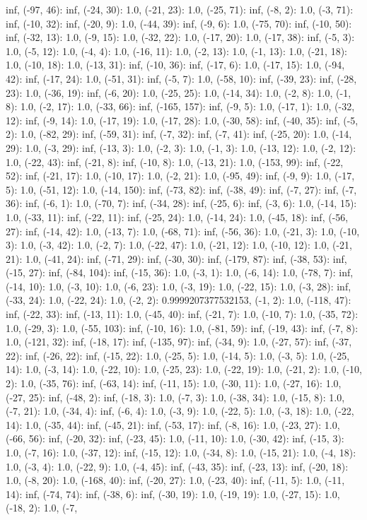 \documentclass[parskip=half]{scrartcl}
\begin{document}
inf, (-97, 46): inf, (-24, 30): 1.0, (-21, 23): 1.0, (-25, 71): inf, (-8, 2): 1.0, (-3, 71): inf, (-10, 32): inf, (-20, 9): 1.0, (-44, 39): inf, (-9, 6): 1.0, (-75, 70): inf, (-10, 50): inf, (-32, 13): 1.0, (-9, 15): 1.0, (-32, 22): 1.0, (-17, 20): 1.0, (-17, 38): inf, (-5, 3): 1.0, (-5, 12): 1.0, (-4, 4): 1.0, (-16, 11): 1.0, (-2, 13): 1.0, (-1, 13): 1.0, (-21, 18): 1.0, (-10, 18): 1.0, (-13, 31): inf, (-10, 36): inf, (-17, 6): 1.0, (-17, 15): 1.0, (-94, 42): inf, (-17, 24): 1.0, (-51, 31): inf, (-5, 7): 1.0, (-58, 10): inf, (-39, 23): inf, (-28, 23): 1.0, (-36, 19): inf, (-6, 20): 1.0, (-25, 25): 1.0, (-14, 34): 1.0, (-2, 8): 1.0, (-1, 8): 1.0, (-2, 17): 1.0, (-33, 66): inf, (-165, 157): inf, (-9, 5): 1.0, (-17, 1): 1.0, (-32, 12): inf, (-9, 14): 1.0, (-17, 19): 1.0, (-17, 28): 1.0, (-30, 58): inf, (-40, 35): inf, (-5, 2): 1.0, (-82, 29): inf, (-59, 31): inf, (-7, 32): inf, (-7, 41): inf, (-25, 20): 1.0, (-14, 29): 1.0, (-3, 29): inf, (-13, 3): 1.0, (-2, 3): 1.0, (-1, 3): 1.0, (-13, 12): 1.0, (-2, 12): 1.0, (-22, 43): inf, (-21, 8): inf, (-10, 8): 1.0, (-13, 21): 1.0, (-153, 99): inf, (-22, 52): inf, (-21, 17): 1.0, (-10, 17): 1.0, (-2, 21): 1.0, (-95, 49): inf, (-9, 9): 1.0, (-17, 5): 1.0, (-51, 12): 1.0, (-14, 150): inf, (-73, 82): inf, (-38, 49): inf, (-7, 27): inf, (-7, 36): inf, (-6, 1): 1.0, (-70, 7): inf, (-34, 28): inf, (-25, 6): inf, (-3, 6): 1.0, (-14, 15): 1.0, (-33, 11): inf, (-22, 11): inf, (-25, 24): 1.0, (-14, 24): 1.0, (-45, 18): inf, (-56, 27): inf, (-14, 42): 1.0, (-13, 7): 1.0, (-68, 71): inf, (-56, 36): 1.0, (-21, 3): 1.0, (-10, 3): 1.0, (-3, 42): 1.0, (-2, 7): 1.0, (-22, 47): 1.0, (-21, 12): 1.0, (-10, 12): 1.0, (-21, 21): 1.0, (-41, 24): inf, (-71, 29): inf, (-30, 30): inf, (-179, 87): inf, (-38, 53): inf, (-15, 27): inf, (-84, 104): inf, (-15, 36): 1.0, (-3, 1): 1.0, (-6, 14): 1.0, (-78, 7): inf, (-14, 10): 1.0, (-3, 10): 1.0, (-6, 23): 1.0, (-3, 19): 1.0, (-22, 15): 1.0, (-3, 28): inf, (-33, 24): 1.0, (-22, 24): 1.0, (-2, 2): 0.9999207377532153, (-1, 2): 1.0, (-118, 47): inf, (-22, 33): inf, (-13, 11): 1.0, (-45, 40): inf, (-21, 7): 1.0, (-10, 7): 1.0, (-35, 72): 1.0, (-29, 3): 1.0, (-55, 103): inf, (-10, 16): 1.0, (-81, 59): inf, (-19, 43): inf, (-7, 8): 1.0, (-121, 32): inf, (-18, 17): inf, (-135, 97): inf, (-34, 9): 1.0, (-27, 57): inf, (-37, 22): inf, (-26, 22): inf, (-15, 22): 1.0, (-25, 5): 1.0, (-14, 5): 1.0, (-3, 5): 1.0, (-25, 14): 1.0, (-3, 14): 1.0, (-22, 10): 1.0, (-25, 23): 1.0, (-22, 19): 1.0, (-21, 2): 1.0, (-10, 2): 1.0, (-35, 76): inf, (-63, 14): inf, (-11, 15): 1.0, (-30, 11): 1.0, (-27, 16): 1.0, (-27, 25): inf, (-48, 2): inf, (-18, 3): 1.0, (-7, 3): 1.0, (-38, 34): 1.0, (-15, 8): 1.0, (-7, 21): 1.0, (-34, 4): inf, (-6, 4): 1.0, (-3, 9): 1.0, (-22, 5): 1.0, (-3, 18): 1.0, (-22, 14): 1.0, (-35, 44): inf, (-45, 21): inf, (-53, 17): inf, (-8, 16): 1.0, (-23, 27): 1.0, (-66, 56): inf, (-20, 32): inf, (-23, 45): 1.0, (-11, 10): 1.0, (-30, 42): inf, (-15, 3): 1.0, (-7, 16): 1.0, (-37, 12): inf, (-15, 12): 1.0, (-34, 8): 1.0, (-15, 21): 1.0, (-4, 18): 1.0, (-3, 4): 1.0, (-22, 9): 1.0, (-4, 45): inf, (-43, 35): inf, (-23, 13): inf, (-20, 18): 1.0, (-8, 20): 1.0, (-168, 40): inf, (-20, 27): 1.0, (-23, 40): inf, (-11, 5): 1.0, (-11, 14): inf, (-74, 74): inf, (-38, 6): inf, (-30, 19): 1.0, (-19, 19): 1.0, (-27, 15): 1.0, (-18, 2): 1.0, (-7, 
\end{document}
